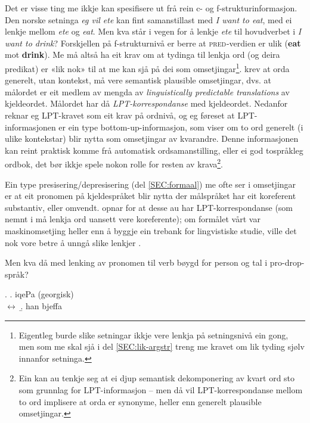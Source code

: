 \documentclass[12pt,a4paper,oneside,draft]{report}
\newcommand{\F}[2]{\textsc{#1}\ensuremath{_{#2}}}
\newcommand{\PRED}{\F{pred}{}}
\begin{document}
Det er visse ting me ikkje kan spesifisere ut frå rein c- og
 f\hyp{}strukturinformasjon. Den norske setninga \emph{eg vil ete} kan fint
 samanstillast med \emph{I want to eat}, med ei lenkje mellom \emph{ete} og
 \emph{eat}. Men kva står i vegen for å lenkje \emph{ete} til hovudverbet i \emph{I  want to drink}? Forskjellen på f\hyp{}strukturnivå er berre at
 \PRED{}-verdien er ulik (\textbf{eat} mot \textbf{drink}). Me må altså ha eit krav
 om at tydinga til lenkja ord (og deira predikat) er «lik nok» til at
 me kan sjå på dei som omsetjingar\footnote{Eigentleg burde slike setningar ikkje vere lenkja på
        setningsnivå ein gong, men som me skal sjå i del
        \ref{SEC:lik-argstr} treng me kravet om lik tyding 
        sjølv innanfor setninga. }. \citet[s.~74]{dyvik2009lmp}
 krev at orda generelt, utan kontekst, må vere semantisk plausible
 omsetjingar, dvs. at målordet er eit medlem av mengda av
 \emph{linguistically predictable translations} av kjeldeordet. Målordet
 har då \emph{LPT\hyp{}korrespondanse} med kjeldeordet.  Nedanfor reknar eg
 LPT-kravet som eit krav på ordnivå, og eg føreset at
 LPT\hyp{}informasjonen er ein type bottom-up-informasjon, som viser om to
 ord generelt (i ulike kontekstar) blir nytta som omsetjingar av
 kvarandre. Denne informasjonen kan reint praktisk komme frå
 automatisk ordsamanstilling, eller ei god tospråkleg ordbok, det bør
 ikkje spele nokon rolle for resten av krava\footnote{Ein kan au tenkje seg at ei djup semantisk dekomponering av
        kvart ord sto som grunnlag for LPT\hyp{}informasjon -- men då vil
        LPT\hyp{}korrespondanse mellom to ord implisere at orda er
        synonyme, heller enn generelt plausible omsetjingar. }.

Ein type presisering/depresisering (del \ref{SEC:formaal}) me ofte ser
 i omsetjingar er at eit pronomen på kjeldespråket blir nytta der
 målspråket har eit koreferent substantiv, eller
 omvendt. \citet{dyvik2009lmp} opnar for at desse au har
 LPT\hyp{}korrespondanse (som nemnt i \cite{thunes2003eal} må lenkja ord
 uansett vere koreferente); om formålet vårt var maskinomsetjing
 heller enn å byggje ein trebank for lingvistiske studie, ville det
 nok vore betre å unngå slike lenkjer \citep[s.~53]{volk2008hjp}.

Men kva då med lenking av pronomen til verb bøygd for person og tal i
pro-drop-språk?

\ex. \a. iqePa                                  \hfill{} (georgisk) \\
     $\leftrightarrow$
     \b. han bjeffa
\end{document}
